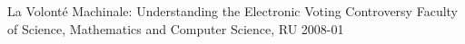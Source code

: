\begin{multicols}{2}
%
%
%
%
%
%
%
%
%
%
%
%
%
%
%
%
%
%
         {La Volont\'{e} Machinale: Understanding the Electronic Voting Controversy}
         {Faculty of Science, Mathematics and Computer Science, RU}
         {2008-01}


\end{multicols}
